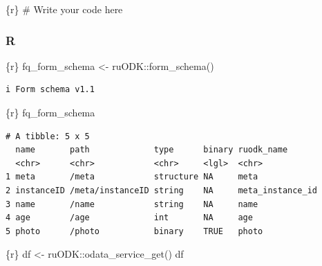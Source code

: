 \documentclass[
  letterpaper,
  DIV=11,
  numbers=noendperiod,
  oneside]{scrreprt}
\newenvironment{Shaded}{\begin{snugshade}}{\end{snugshade}}
\newcommand{\CommentTok}[1]{\textcolor[rgb]{0.37,0.37,0.37}{#1}}
\newcommand{\FunctionTok}[1]{\textcolor[rgb]{0.28,0.35,0.67}{#1}}
\newcommand{\InformationTok}[1]{\textcolor[rgb]{0.37,0.37,0.37}{#1}}
\newcommand{\NormalTok}[1]{\textcolor[rgb]{0.00,0.23,0.31}{#1}}
\newcommand{\OtherTok}[1]{\textcolor[rgb]{0.00,0.23,0.31}{#1}}
\newcommand{\SpecialCharTok}[1]{\textcolor[rgb]{0.37,0.37,0.37}{#1}}
\begin{document}
\begin{Shaded}
\begin{Highlighting}[]
\InformationTok{\textasciigrave{}\textasciigrave{}\textasciigrave{}\{r\}}
\CommentTok{\# Write your code here}
\InformationTok{\textasciigrave{}\textasciigrave{}\textasciigrave{}}
\end{Highlighting}
\end{Shaded}

\hypertarget{r-18}{%
\subsubsection{R}\label{r-18}}

\begin{Shaded}
\begin{Highlighting}[]
\InformationTok{\textasciigrave{}\textasciigrave{}\textasciigrave{}\{r\}}
\NormalTok{fq\_form\_schema }\OtherTok{\textless{}{-}}\NormalTok{ ruODK}\SpecialCharTok{::}\FunctionTok{form\_schema}\NormalTok{()}
\InformationTok{\textasciigrave{}\textasciigrave{}\textasciigrave{}}
\end{Highlighting}
\end{Shaded}

\begin{verbatim}
i Form schema v1.1
\end{verbatim}

\begin{Shaded}
\begin{Highlighting}[]
\InformationTok{\textasciigrave{}\textasciigrave{}\textasciigrave{}\{r\}}
\NormalTok{fq\_form\_schema}
\InformationTok{\textasciigrave{}\textasciigrave{}\textasciigrave{}}
\end{Highlighting}
\end{Shaded}

\begin{verbatim}
# A tibble: 5 x 5
  name       path             type      binary ruodk_name      
  <chr>      <chr>            <chr>     <lgl>  <chr>           
1 meta       /meta            structure NA     meta            
2 instanceID /meta/instanceID string    NA     meta_instance_id
3 name       /name            string    NA     name            
4 age        /age             int       NA     age             
5 photo      /photo           binary    TRUE   photo           
\end{verbatim}

\begin{Shaded}
\begin{Highlighting}[]
\InformationTok{\textasciigrave{}\textasciigrave{}\textasciigrave{}\{r\}}
\NormalTok{df }\OtherTok{\textless{}{-}}\NormalTok{ ruODK}\SpecialCharTok{::}\FunctionTok{odata\_service\_get}\NormalTok{()}
\NormalTok{df}
\InformationTok{\textasciigrave{}\textasciigrave{}\textasciigrave{}}
\end{Highlighting}
\end{Shaded}
\end{document}
